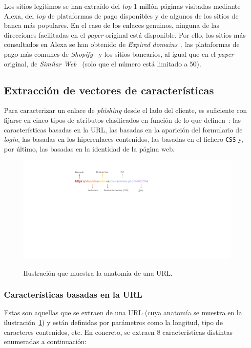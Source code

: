 Los sitios legítimos se han extraído del \textit{top} 1 millón páginas visitadas mediante Alexa, del \textit{top} de plataformas de pago disponibles y de algunos de los sitios de banca más populares. En el caso de los enlaces genuinos, ninguna de las direcciones facilitadas en el \textit{paper} original está disponible. Por ello, los sitios más consultados en Alexa se han obtenido de \textit{Expired domains}~\cite{AlexaTopWebsites}, las plataformas de pago más comunes de \textit{Shopify}~\cite{paymentGatewaysWebsites} y los sitios bancarios, al igual que en el \textit{paper} original, de \textit{Similar Web}~\cite{banksitesTop} (solo que el número está limitado a 50).

\subsection{Extracción de vectores de características}

Para caracterizar un enlace de \textit{phishing} desde el lado del cliente, es suficiente con fijarse en cinco tipos de atributos clasificados en función de lo que definen~\cite{featuresPhishing2018Gupta}: las características basadas en la URL, las basadas en la aparición del formulario de \textit{login}, las  basadas en los hiperenlaces contenidos, las basadas en el fichero \texttt{CSS} y, por último, las basadas en la identidad de la página web.


\begin{figure}[h]
	\caption[\textit{Phishing}: Anatomía de una URL.]{Ilustración que muestra la anatomía de una URL.}
	\centering
	\includegraphics[scale=0.4]{../img/memoria/5_url_anatomia}
	\label{img:5_url_anatomia}
\end{figure}


\subsubsection{Características basadas en la URL}
Estas son aquellas que se extraen de una URL (cuya anatomía se muestra en la ilustración~\ref{img:5_url_anatomia}) y están definidas por parámetros como la longitud, tipo de caracteres contenidos, etc. En concreto, se extraen 8 características distintas enumeradas a continuación:

